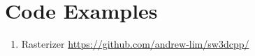 \section{Code Examples}
\begin{enumerate}
    \item Rasterizer \url{https://github.com/andrew-lim/sw3dcpp/}
\end{enumerate}
\clearpage